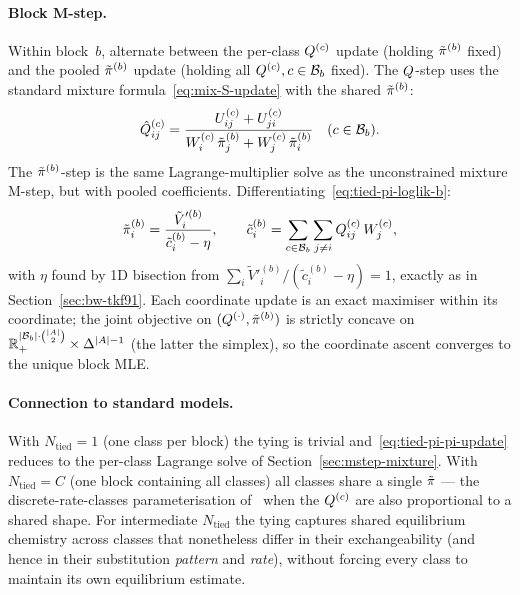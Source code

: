 \paragraph{Block M-step.}
Within block~$b$, alternate between the per-class $Q^{(c)}$ update
(holding $\tilde{\pi}^{(b)}$ fixed) and the pooled $\tilde{\pi}^{(b)}$
update (holding all $Q^{(c)}, c\in\mathcal{B}_b$ fixed).
The $Q$-step uses the standard mixture
formula~\eqref{eq:mix-S-update} with the shared $\tilde{\pi}^{(b)}$:
\begin{equation}\label{eq:tied-pi-S-update}
\hat{Q}^{(c)}_{ij}
= \frac{U^{(c)}_{ij}+U^{(c)}_{ji}}
       {W^{(c)}_i\,\tilde{\pi}^{(b)}_j
       + W^{(c)}_j\,\tilde{\pi}^{(b)}_i}
\quad (c\in\mathcal{B}_b).
\end{equation}
The $\tilde{\pi}^{(b)}$-step is the same Lagrange-multiplier solve as
the unconstrained mixture M-step, but with pooled coefficients.
Differentiating~\eqref{eq:tied-pi-loglik-b}:
\begin{equation}\label{eq:tied-pi-pi-update}
\tilde{\pi}^{(b)}_i
= \frac{\tilde V'^{(b)}_i}{\tilde c^{(b)}_i - \eta},
\qquad
\tilde c^{(b)}_i
= \sum_{c\in\mathcal{B}_b}\sum_{j\neq i}Q^{(c)}_{ij}\,W^{(c)}_j,
\end{equation}
with $\eta$ found by 1D bisection from
$\sum_i \tilde V'^{(b)}_i / (\tilde c^{(b)}_i - \eta) = 1$, exactly as
in Section~\ref{sec:bw-tkf91}.  Each coordinate update is an exact
maximiser within its coordinate; the joint objective on
$(Q^{(\cdot)}, \tilde{\pi}^{(b)})$ is strictly concave on
$\mathbb{R}_+^{|\mathcal{B}_b| \cdot \binom{|A|}{2}}
   \times \Delta^{|A|-1}$ (the latter the simplex), so the
coordinate ascent converges to the unique block MLE.

\paragraph{Connection to standard models.}
With $N_{\mathrm{tied}} = 1$ (one class per block) the tying is
trivial and~\eqref{eq:tied-pi-pi-update} reduces to the per-class
Lagrange solve of Section~\ref{sec:mstep-mixture}.
With $N_{\mathrm{tied}} = C$ (one block containing all classes) all
classes share a single $\tilde{\pi}$ — the discrete-rate-classes
parameterisation of~\cite{Yang1994a} when the $Q^{(c)}$ are also
proportional to a shared shape.
For intermediate $N_{\mathrm{tied}}$ the tying captures shared
equilibrium chemistry across classes that nonetheless differ in their
exchangeability (and hence in their substitution \emph{pattern} and
\emph{rate}), without forcing every class to maintain its own
equilibrium estimate.

